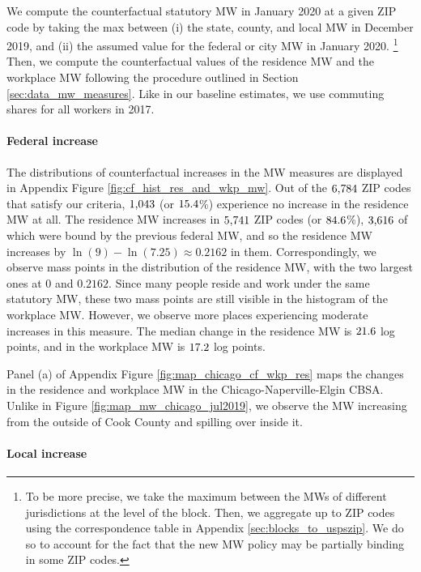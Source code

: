 We compute the counterfactual statutory MW in January 2020 at a given ZIP code 
by taking the max between (i) the state, county, and local MW in December 2019, 
and (ii) the assumed value for the federal or city MW in January 2020.%
\footnote{To be more precise, we take the maximum between the MWs of different
jurisdictions at the level of the block.
Then, we aggregate up to ZIP codes using the correspondence table in Appendix 
\ref{sec:blocks_to_uspszip}.
We do so to account for the fact that the new MW policy may be partially 
binding in some ZIP codes.}
Then, we compute the counterfactual values of the residence MW and the workplace
MW following the procedure outlined in Section \ref{sec:data_mw_measures}.
Like in our baseline estimates, we use commuting shares for all workers in
2017.

\paragraph{Federal increase}

The distributions of counterfactual increases in the MW measures are displayed 
in Appendix Figure \ref{fig:cf_hist_res_and_wkp_mw}.
Out of the $\textnormal{6,784}$ ZIP codes that satisfy our criteria, 
$\textnormal{1,043}$ (or $\textnormal{15.4}$\%) experience no increase in 
the residence MW at all.
The residence MW increases in $\textnormal{5,741}$ ZIP codes  (or $\textnormal{84.6}$\%), 
$\textnormal{3,616}$ of which were bound by the previous federal MW, and 
so the residence MW increases by $\ln(9)-\ln(7.25)\approx 0.2162$ in them.
Correspondingly, we observe mass points in the distribution of the residence MW,
with the two largest ones at $0$ and $0.2162$.
Since many people reside and work under the same statutory MW, these two mass
points are still visible in the histogram of the workplace MW.
However, we observe more places experiencing moderate increases in this measure.
The median change in the residence MW is $\textnormal{21.6}$ log points, and 
in the workplace MW is $\textnormal{17.2}$ log points.

Panel (a) of Appendix Figure \ref{fig:map_chicago_cf_wkp_res} maps the changes 
in the residence and workplace MW in the Chicago-Naperville-Elgin CBSA.
Unlike in Figure \ref{fig:map_mw_chicago_jul2019}, we observe the MW increasing 
from the outside of Cook County and spilling over inside it.

\paragraph{Local increase}

